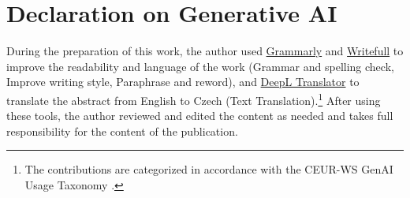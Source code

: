 \chapter*{Declaration on Generative AI}

During the preparation of this work, the author used
\href{https://grammarly.com/}{Grammarly} and \href{https://www.writefull.com/}{Writefull} to improve the readability and language of the work (Grammar and spelling check, Improve writing style, Paraphrase and reword), and
\href{https://www.deepl.com/}{DeepL Translator} to translate the abstract from English to Czech (Text Translation).\footnote{The contributions are categorized in accordance with the CEUR-WS GenAI Usage Taxonomy \cite{GenAITaxonomy}.}
After using these tools, the author reviewed and edited the content as needed and takes full responsibility for the content of the publication.
